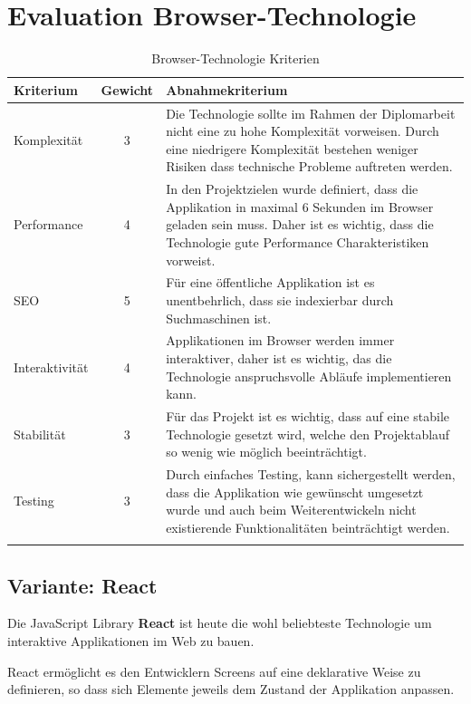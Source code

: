 

\clearpage
\section{Evaluation Browser-Technologie}\label{evaluation-browser-technologie}



\begin{longtable}[]{@{}p{2cm}cp{10cm}@{}}
  \toprule
  \textbf{Kriterium} & \textbf{Gewicht} & \textbf{Abnahmekriterium}\tabularnewline
  \midrule
  \endhead
  Komplexität        & 3                & Die Technologie sollte im Rahmen der Diplomarbeit nicht eine zu hohe Komplexität vorweisen. Durch eine niedrigere Komplexität bestehen weniger Risiken dass technische Probleme auftreten werden.\tabularnewline
  \midrule
  Performance        & 4                & In den Projektzielen wurde definiert, dass die Applikation in maximal 6 Sekunden im Browser geladen sein muss. Daher ist es wichtig, dass die Technologie gute Performance Charakteristiken vorweist.\tabularnewline
  \midrule
  SEO                & 5                & Für eine öffentliche Applikation ist es unentbehrlich, dass sie indexierbar durch Suchmaschinen ist.\tabularnewline
  \midrule
  Interaktivität     & 4                & Applikationen im Browser werden immer interaktiver, daher ist es wichtig, das die Technologie anspruchsvolle Abläufe implementieren kann. \tabularnewline
  \midrule
  Stabilität         & 3                & Für das Projekt ist es wichtig, dass auf eine stabile Technologie gesetzt wird, welche den Projektablauf so wenig wie möglich beeinträchtigt. \tabularnewline
  \midrule
  Testing            & 3                & Durch einfaches Testing, kann sichergestellt werden, dass die Applikation wie gewünscht umgesetzt wurde und auch beim Weiterentwickeln nicht existierende Funktionalitäten beinträchtigt werden.\tabularnewline
  \bottomrule
  \caption{Browser-Technologie Kriterien}
\end{longtable}

\clearpage
\subsection{Variante: React}

Die JavaScript Library \textbf{React} ist heute die wohl beliebteste
Technologie um interaktive Applikationen im Web zu bauen.

React ermöglicht es den Entwicklern Screens auf eine deklarative Weise zu
definieren, so dass sich Elemente jeweils dem Zustand der Applikation anpassen.

